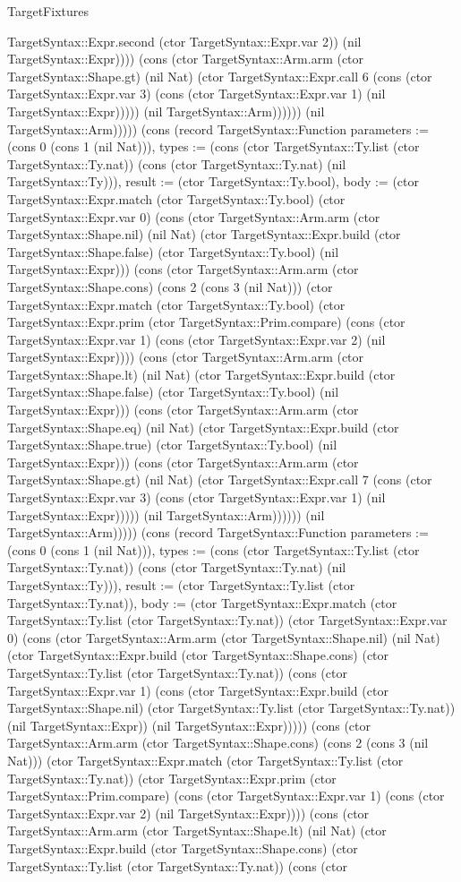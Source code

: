 \begin{lexlean}{TargetFixtures}
\begin{semanticmodule}
{TargetSyntax::Expr.second (ctor TargetSyntax::Expr.var 2)) (nil TargetSyntax::Expr)))) (cons (ctor TargetSyntax::Arm.arm (ctor TargetSyntax::Shape.gt) (nil Nat) (ctor TargetSyntax::Expr.call 6 (cons (ctor TargetSyntax::Expr.var 3) (cons (ctor TargetSyntax::Expr.var 1) (nil TargetSyntax::Expr))))) (nil TargetSyntax::Arm)))))) (nil TargetSyntax::Arm))))}) (cons (record TargetSyntax::Function {parameters := (cons 0 (cons 1 (nil Nat))), types := (cons (ctor TargetSyntax::Ty.list (ctor TargetSyntax::Ty.nat)) (cons (ctor TargetSyntax::Ty.nat) (nil TargetSyntax::Ty))), result := (ctor TargetSyntax::Ty.bool), body := (ctor TargetSyntax::Expr.match (ctor TargetSyntax::Ty.bool) (ctor TargetSyntax::Expr.var 0) (cons (ctor TargetSyntax::Arm.arm (ctor TargetSyntax::Shape.nil) (nil Nat) (ctor TargetSyntax::Expr.build (ctor TargetSyntax::Shape.false) (ctor TargetSyntax::Ty.bool) (nil TargetSyntax::Expr))) (cons (ctor TargetSyntax::Arm.arm (ctor TargetSyntax::Shape.cons) (cons 2 (cons 3 (nil Nat))) (ctor TargetSyntax::Expr.match (ctor TargetSyntax::Ty.bool) (ctor TargetSyntax::Expr.prim (ctor TargetSyntax::Prim.compare) (cons (ctor TargetSyntax::Expr.var 1) (cons (ctor TargetSyntax::Expr.var 2) (nil TargetSyntax::Expr)))) (cons (ctor TargetSyntax::Arm.arm (ctor TargetSyntax::Shape.lt) (nil Nat) (ctor TargetSyntax::Expr.build (ctor TargetSyntax::Shape.false) (ctor TargetSyntax::Ty.bool) (nil TargetSyntax::Expr))) (cons (ctor TargetSyntax::Arm.arm (ctor TargetSyntax::Shape.eq) (nil Nat) (ctor TargetSyntax::Expr.build (ctor TargetSyntax::Shape.true) (ctor TargetSyntax::Ty.bool) (nil TargetSyntax::Expr))) (cons (ctor TargetSyntax::Arm.arm (ctor TargetSyntax::Shape.gt) (nil Nat) (ctor TargetSyntax::Expr.call 7 (cons (ctor TargetSyntax::Expr.var 3) (cons (ctor TargetSyntax::Expr.var 1) (nil TargetSyntax::Expr))))) (nil TargetSyntax::Arm)))))) (nil TargetSyntax::Arm))))}) (cons (record TargetSyntax::Function {parameters := (cons 0 (cons 1 (nil Nat))), types := (cons (ctor TargetSyntax::Ty.list (ctor TargetSyntax::Ty.nat)) (cons (ctor TargetSyntax::Ty.nat) (nil TargetSyntax::Ty))), result := (ctor TargetSyntax::Ty.list (ctor TargetSyntax::Ty.nat)), body := (ctor TargetSyntax::Expr.match (ctor TargetSyntax::Ty.list (ctor TargetSyntax::Ty.nat)) (ctor TargetSyntax::Expr.var 0) (cons (ctor TargetSyntax::Arm.arm (ctor TargetSyntax::Shape.nil) (nil Nat) (ctor TargetSyntax::Expr.build (ctor TargetSyntax::Shape.cons) (ctor TargetSyntax::Ty.list (ctor TargetSyntax::Ty.nat)) (cons (ctor TargetSyntax::Expr.var 1) (cons (ctor TargetSyntax::Expr.build (ctor TargetSyntax::Shape.nil) (ctor TargetSyntax::Ty.list (ctor TargetSyntax::Ty.nat)) (nil TargetSyntax::Expr)) (nil TargetSyntax::Expr))))) (cons (ctor TargetSyntax::Arm.arm (ctor TargetSyntax::Shape.cons) (cons 2 (cons 3 (nil Nat))) (ctor TargetSyntax::Expr.match (ctor TargetSyntax::Ty.list (ctor TargetSyntax::Ty.nat)) (ctor TargetSyntax::Expr.prim (ctor TargetSyntax::Prim.compare) (cons (ctor TargetSyntax::Expr.var 1) (cons (ctor TargetSyntax::Expr.var 2) (nil TargetSyntax::Expr)))) (cons (ctor TargetSyntax::Arm.arm (ctor TargetSyntax::Shape.lt) (nil Nat) (ctor TargetSyntax::Expr.build (ctor TargetSyntax::Shape.cons) (ctor TargetSyntax::Ty.list (ctor TargetSyntax::Ty.nat)) (cons (ctor }
\end{semanticmodule}
\end{lexlean}
